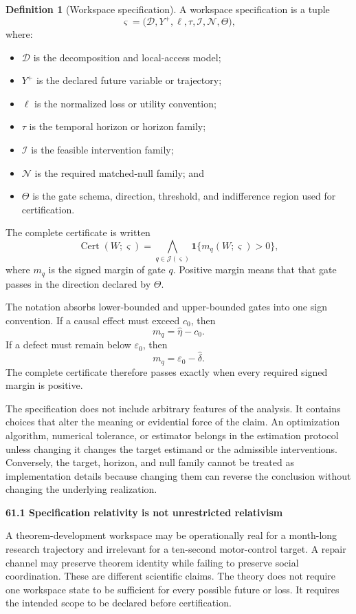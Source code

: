 \documentclass[11pt,letterpaper]{article}
\newcommand{\subtopic}[1]{%
 \vspace{0.45em}
 {\bfseries\color{AccentColor} #1\par}
}
\theoremstyle{plain}
\theoremstyle{definition}
\newtheorem{definition}[theorem]{Definition}
\begin{document}
\begin{definition}[Workspace specification]\label{def:workspace-specification}
A workspace specification is a tuple
\[
\boxed{
\varsigma
=
\bigl(
\mathcal D,
Y^+,
\ell,
\tau,
\mathcal I,
\mathcal N,
\Theta
\bigr),
}
\]
where:
\begin{itemize}
\item \(\mathcal D\) is the decomposition and local-access model;
\item \(Y^+\) is the declared future variable or trajectory;
\item \(\ell\) is the normalized loss or utility convention;
\item \(\tau\) is the temporal horizon or horizon family;
\item \(\mathcal I\) is the feasible intervention family;
\item \(\mathcal N\) is the required matched-null family; and
\item \(\Theta\) is the gate schema, direction, threshold, and indifference
 region used for certification.
\end{itemize}
The complete certificate is written
\[
\operatorname{Cert}(W;\varsigma)
=
\bigwedge_{q\in\mathcal J(\varsigma)}
\mathbf 1\{m_q(W;\varsigma)>0\},
\]
where \(m_q\) is the signed margin of gate \(q\). Positive margin means that
that gate passes in the direction declared by \(\Theta\).
\end{definition}

The notation absorbs lower-bounded and upper-bounded gates into one sign
convention. If a causal effect must exceed \(c_0\), then
\[
m_q=\widehat\eta-c_0.
\]
If a defect must remain below \(\varepsilon_0\), then
\[
m_q=\varepsilon_0-\widehat\delta.
\]
The complete certificate therefore passes exactly when every required signed
margin is positive.

The specification does not include arbitrary features of the analysis. It
contains choices that alter the meaning or evidential force of the claim. An
optimization algorithm, numerical tolerance, or estimator belongs in the
estimation protocol unless changing it changes the target estimand or the
admissible interventions. Conversely, the target, horizon, and null family
cannot be treated as implementation details because changing them can reverse
the conclusion without changing the underlying realization.

\subtopic{61.1 Specification relativity is not unrestricted relativism}

A theorem-development workspace may be operationally real for a month-long
research trajectory and irrelevant for a ten-second motor-control target. A
repair channel may preserve theorem identity while failing to preserve social
coordination. These are different scientific claims. The theory does not
require one workspace state to be sufficient for every possible future or loss.
It requires the intended scope to be declared before certification.
\end{document}
